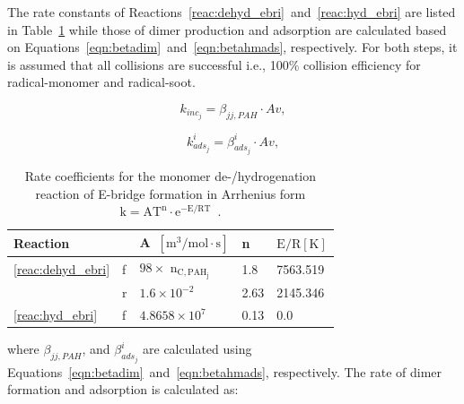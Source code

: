 


The rate constants of Reactions~\eqref{reac:dehyd_ebri}~and~\eqref{reac:hyd_ebri} are listed in Table~\ref{tab:Ebridge} while those of dimer production and adsorption are calculated based on Equations~\eqref{eqn:betadim}~and~\eqref{eqn:betahmads}, respectively. For both steps, it is assumed that all collisions are successful i.e., 100\% collision efficiency for radical-monomer and radical-soot.

\begin{equation}
	k_{inc_j}=
	\beta_{jj,PAH}\cdot Av
	\label{eqn:kdim_ebri},
\end{equation}

\begin{equation}
	k^i_{ads_{j}}=
	\beta^i_{ads_j}\cdot Av
	\label{eqn:kads_ebir},
\end{equation}

\renewcommand{\arraystretch}{1.5}
\begin{table}
	\caption{Rate coefficients for the monomer de-/hydrogenation reaction of E-bridge formation in Arrhenius form $\mathrm{k=AT^n\cdot e^{-E/RT}}$~\citep{frenklach2020mechanism}.}
	\label{tab:Ebridge}
	\centering
	\begin{tabular}{l l l l l}
		\hline
		Reaction & \hspace{0.1cm} & A~$\mathrm{\left[{m^3}/{mol\cdot s} \right]}$ & n & $\mathrm{{E}/{R} [K]}$  \\
		\hline
		\eqref{reac:dehyd_ebri} & f & $98\times$ $\mathrm{n_{C, PAH_j}}$ & 1.8 & 7563.519 \\
		  & r & $1.6\times 10^{-2}$ & 2.63 & 2145.346\\
		\eqref{reac:hyd_ebri} & f & $4.8658\times10^7
		$ & 0.13 & 0.0\\
		\hline
	\end{tabular}
\end{table}

\noindent where $\beta_{jj,PAH}$, and $\beta^i_{ads_j}$ are calculated using Equations~\eqref{eqn:betadim}~and~\eqref{eqn:betahmads}, respectively. The rate of dimer formation and adsorption is calculated as:

